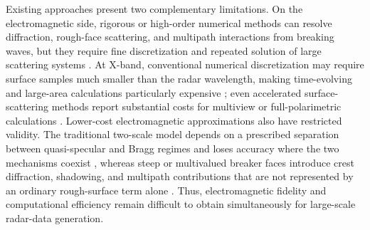 Existing approaches present two complementary limitations. On the electromagnetic side, rigorous or high-order numerical methods can resolve diffraction, rough-face scattering, and multipath interactions from breaking waves, but they require fine discretization and repeated solution of large scattering systems \cite{west1998mmgtd,yang2011breaking}. At X-band, conventional numerical discretization may require surface samples much smaller than the radar wavelength, making time-evolving and large-area calculations particularly expensive \cite{zhang2023secondorder}; even accelerated surface-scattering methods report substantial costs for multiview or full-polarimetric calculations \cite{li2019fpfsm}. Lower-cost electromagnetic approximations also have restricted validity. The traditional two-scale model depends on a prescribed separation between quasi-specular and Bragg regimes and loses accuracy where the two mechanisms coexist \cite{ye2022improvedTSM}, whereas steep or multivalued breaker faces introduce crest diffraction, shadowing, and multipath contributions that are not represented by an ordinary rough-surface term alone \cite{west2002plunging,west2002multipath,zhao2005spilling}. Thus, electromagnetic fidelity and computational efficiency remain difficult to obtain simultaneously for large-scale radar-data generation.

